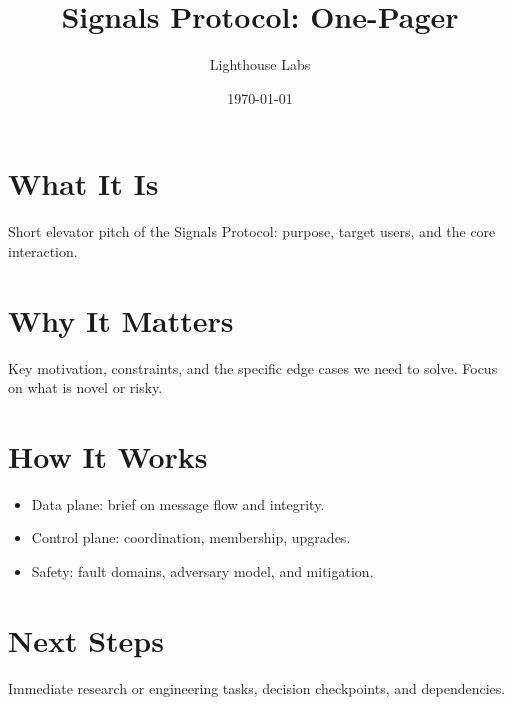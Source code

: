 \documentclass[11pt]{article}
\title{Signals Protocol: One-Pager}
\author{Lighthouse Labs}
\date{\today}
\begin{document}
\maketitle
\thispagestyle{plain}

\section*{What It Is}
Short elevator pitch of the Signals Protocol: purpose, target users, and the core interaction.

\section*{Why It Matters}
Key motivation, constraints, and the specific edge cases we need to solve. Focus on what is novel or risky.

\section*{How It Works}
\begin{itemize}
  \item Data plane: brief on message flow and integrity.
  \item Control plane: coordination, membership, upgrades.
  \item Safety: fault domains, adversary model, and mitigation.
\end{itemize}

\section*{Next Steps}
Immediate research or engineering tasks, decision checkpoints, and dependencies.
\end{document}
